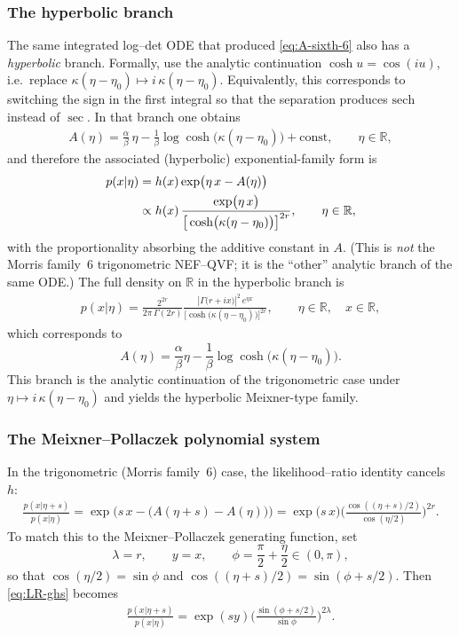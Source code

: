 \documentclass[a4paper,11pt]{article}
\numberwithin{equation}{section}
\theoremstyle{plain}
\theoremstyle{definition}
\theoremstyle{remark}
\newcommand{\R}{\ensuremath{\mathbb{R}}\xspace}
\newcommand{\1}{\ensuremath{\mathds{1}}\xspace}
\begin{document}
\subsubsection{The hyperbolic branch}
The same integrated log--det ODE that produced \eqref{eq:A-sixth-6} also has a \emph{hyperbolic} branch.
Formally, use the analytic continuation $\cosh u=\cos(iu)$, i.e.\ replace $\kappa(\eta-\eta_0)\mapsto i\,\kappa(\eta-\eta_0)$.
Equivalently, this corresponds to switching the sign in the first integral so that the separation produces $\text{sech}$ instead of $\sec$.
In that branch one obtains
\begin{align}
A(\eta)
=\frac{\alpha}{\beta}\,\eta-\frac{1}{\beta}\log\cosh\!\big(\kappa(\eta-\eta_0)\big)+\text{const},
\qquad \eta\in\R,
\label{eq:A-sixth-cosh}
\end{align}
and therefore the associated (hyperbolic) exponential-family form is
\begin{align}
p(x| \eta)
&=h(x)\exp\!\big(\eta\,x-A(\eta)\big)\notag\\
&\propto h(x)\,
\frac{\exp\!\big(\eta\,x\big)}{\big[\cosh\!\big(\kappa(\eta-\eta_0)\big)\big]^{2r}},
\qquad \eta\in\R,
\label{eq:pdf-ghs-cosh}
\end{align}
with the proportionality absorbing the additive constant in $A$. (This is \emph{not} the Morris family~6
trigonometric NEF--QVF; it is the ``other'' analytic branch of the same ODE.)
The full density on $\mathbb{R}$ in the hyperbolic branch is
\begin{align}
p(x| \eta)
=
\frac{2^{2r}}{2\pi\,\Gamma(2r)}
\frac{\left|\Gamma\!\big(r+i x\big)\right|^2
\,e^{\eta x}}
{\big[\cosh\!\big(\kappa(\eta-\eta_0)\big)\big]^{2r}},
\qquad
\eta\in\mathbb{R},
\quad x\in\mathbb{R},
\end{align}
which corresponds to
\[
A(\eta)=\frac{\alpha}{\beta}\eta-\frac{1}{\beta}\log\cosh\!\big(\kappa(\eta-\eta_0)\big).
\]
This branch is the analytic continuation of the trigonometric case under
$\eta\mapsto i\,\kappa(\eta-\eta_0)$ and yields the hyperbolic Meixner-type family.

\subsubsection{The Meixner--Pollaczek polynomial system}
In the trigonometric (Morris family~6) case, the likelihood--ratio identity cancels $h$:
\begin{align}
\frac{p(x| \eta+s)}{p(x| \eta)}
=\exp\!\Big(s\,x-\big(A(\eta+s)-A(\eta)\big)\Big)
=\exp\!\big(s\,x\big)\Big(\frac{\cos((\eta+s)/2)}{\cos(\eta/2)}\Big)^{\!2r}.
\label{eq:LR-ghs}
\end{align}
To match this to the Meixner--Pollaczek generating function, set
\[
\lambda=r,\qquad y=x,\qquad \phi=\frac{\pi}{2}+\frac{\eta}{2}\in(0,\pi),
\]
so that $\cos(\eta/2)=\sin\phi$ and $\cos((\eta+s)/2)=\sin(\phi+s/2)$. Then \eqref{eq:LR-ghs} becomes
\begin{align}
\frac{p(x| \eta+s)}{p(x| \eta)}
=\exp(sy)\Big(\frac{\sin(\phi+s/2)}{\sin\phi}\Big)^{\!2\lambda}.
\label{eq:LR-ghs-sin}
\end{align}
\end{document}
